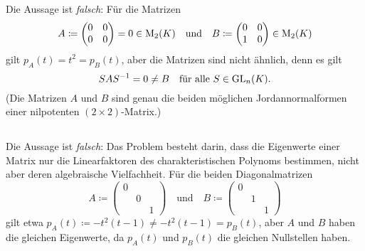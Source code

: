 \section{}





\subsection{}

Die Aussage ist \emph{falsch}:
Für die Matrizen
\[
            A
  \coloneqq \begin{pmatrix}
              0 & 0
              \\
              0 & 0
            \end{pmatrix}
  =         0
  \in       \operatorname{M}_{2}(K)
  \quad\text{und}\quad
            B
  \coloneqq \begin{pmatrix}
              0 & 0
              \\
              1 & 0
            \end{pmatrix}
  \in       \operatorname{M}_{2}(K)
\]
gilt $p_A(t) = t^2 = p_B(t)$, aber die Matrizen sind nicht ähnlich, denn es gilt
\[
        S A S^{-1} 
  =     0
  \neq  B
  \quad
  \text{für alle $S \in \operatorname{GL}_{n}(K)$}.
\]
(Die Matrizen $A$ und $B$ sind genau die beiden möglichen Jordannormalformen einer nilpotenten $(2 \times 2)$-Matrix.)





\subsection{}

Die Aussage ist \emph{falsch}:
Das Problem besteht darin, dass die Eigenwerte einer Matrix nur die Linearfaktoren des charakteristischen Polynoms bestimmen, nicht aber deren algebraische Vielfachheit.
Für die beiden Diagonalmatrizen
\[
            A
  \coloneqq \begin{pmatrix}
              0 &   &
              \\
                & 0 &
              \\
                &   & 1
            \end{pmatrix}
  \quad\text{und}\quad
            B
  \coloneqq \begin{pmatrix}
              0 &   &
              \\
                & 1 &
              \\
                &   & 1
            \end{pmatrix}
\]
gilt etwa $p_A(t) \coloneqq - t^2 (t-1) \neq - t^2 (t-1) = p_B(t)$, aber $A$ und $B$ haben die gleichen Eigenwerte, da $p_A(t)$ und $p_B(t)$ die gleichen Nullstellen haben.





